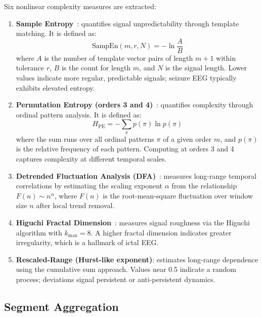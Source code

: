 Six nonlinear complexity measures are extracted:
\begin{enumerate}
    \item \textbf{Sample Entropy}~\citep{richman2000physiological}: quantifies signal unpredictability through template matching. It is defined as:
    \begin{equation}
        \text{SampEn}(m, r, N) = -\ln\frac{A}{B}
        \label{eq:sampen}
    \end{equation}
    where $A$ is the number of template vector pairs of length $m+1$ within tolerance $r$, $B$ is the count for length $m$, and $N$ is the signal length. Lower values indicate more regular, predictable signals; seizure EEG typically exhibits elevated entropy.

    \item \textbf{Permutation Entropy (orders 3 and 4)}~\citep{bandt2002permutation}: quantifies complexity through ordinal pattern analysis. It is defined as:
    \begin{equation}
        H_{\text{PE}} = -\sum_{\pi} p(\pi) \ln p(\pi)
        \label{eq:perment}
    \end{equation}
    where the sum runs over all ordinal patterns $\pi$ of a given order $m$, and $p(\pi)$ is the relative frequency of each pattern. Computing at orders 3 and 4 captures complexity at different temporal scales.

    \item \textbf{Detrended Fluctuation Analysis (DFA)}~\citep{peng1994mosaic}: measures long-range temporal correlations by estimating the scaling exponent $\alpha$ from the relationship $F(n) \sim n^{\alpha}$, where $F(n)$ is the root-mean-square fluctuation over window size $n$ after local trend removal.

    \item \textbf{Higuchi Fractal Dimension}~\citep{higuchi1988approach}: measures signal roughness via the Higuchi algorithm with $k_{\max} = 8$. A higher fractal dimension indicates greater irregularity, which is a hallmark of ictal EEG.

    \item \textbf{Rescaled-Range (Hurst-like exponent)}: estimates long-range dependence using the cumulative sum approach. Values near 0.5 indicate a random process; deviations signal persistent or anti-persistent dynamics.
\end{enumerate}

\subsection{Segment Aggregation}

